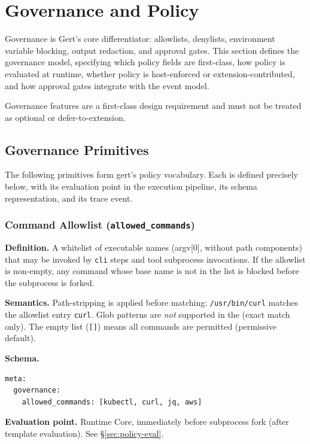 \chapter{Governance and Policy}
\label{ch:governance}

Governance is Gert's core differentiator: allowlists, denylists, environment variable blocking,
output redaction, and approval gates. This section defines the governance model, specifying
which policy fields are first-class, how policy is evaluated at runtime, whether policy is
host-enforced or extension-contributed, and how approval gates integrate with the event model.

Governance features are a first-class design requirement and must not be treated as optional
or defer-to-extension.

\section{Governance Primitives}

The following primitives form gert's policy vocabulary. Each is defined precisely below, with
its evaluation point in the execution pipeline, its schema representation, and its trace event.

\subsection{Command Allowlist (\texttt{allowed\_commands})}

\textbf{Definition.} A whitelist of executable names (argv[0], without path components) that
may be invoked by \texttt{cli} steps and tool subprocess invocations. If the allowlist is
non-empty, any command whose base name is not in the list is blocked before the subprocess is
forked.

\textbf{Semantics.} Path-stripping is applied before matching: \texttt{/usr/bin/curl} matches
the allowlist entry \texttt{curl}. Glob patterns are \emph{not} supported in the (exact match
only). The empty list (\texttt{[]}) means all commands are permitted (permissive default).

\textbf{Schema.}
\begin{verbatim}
meta:
  governance:
    allowed_commands: [kubectl, curl, jq, aws]
\end{verbatim}

\textbf{Evaluation point.} Runtime Core, immediately before subprocess fork (after template
evaluation). See §\ref{sec:policy-eval}.

